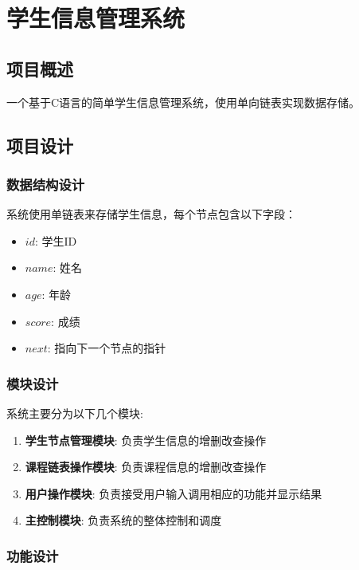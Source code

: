 \chapter{学生信息管理系统}

\section{项目概述}

一个基于C语言的简单学生信息管理系统，使用单向链表实现数据存储。

\section{项目设计}

\subsection{数据结构设计}\label{sub:data_structure_design}

系统使用单链表来存储学生信息，每个节点包含以下字段：
\begin{itemize}
    \item $id$: 学生ID
    \item $name$: 姓名
    \item $age$: 年龄
    \item $score$: 成绩
    \item $next$: 指向下一个节点的指针
\end{itemize}

\subsection{模块设计}

系统主要分为以下几个模块: 

\begin{enumerate}
    \item \textbf{学生节点管理模块}: 负责学生信息的增删改查操作
    \item \textbf{课程链表操作模块}: 负责课程信息的增删改查操作
    \item \textbf{用户操作模块}: 负责接受用户输入调用相应的功能并显示结果
    \item \textbf{主控制模块}: 负责系统的整体控制和调度
\end{enumerate}

\subsection{功能设计}

